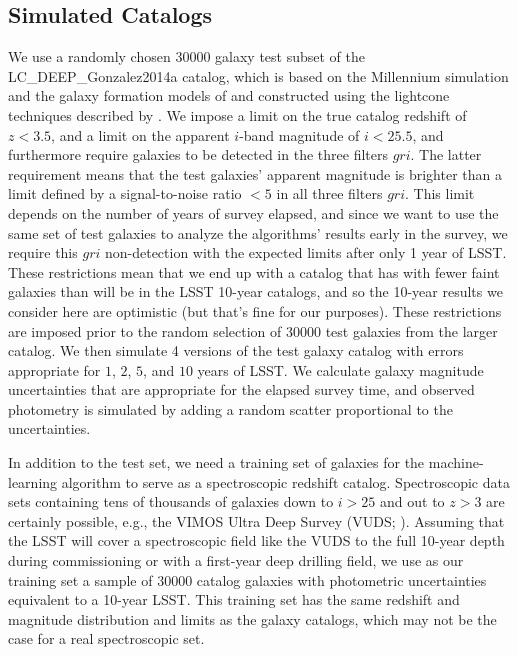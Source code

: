 \documentclass[DM,lsstdraft,toc]{lsstdoc}
\begin{document}
\subsection{Simulated Catalogs}\label{ssec:cats}

We use a randomly chosen 30000 galaxy test subset of the {\sc LC\_DEEP\_Gonzalez2014a} catalog, which is based on the Millennium simulation \citep{2005Natur.435..629S} and the galaxy formation models of \cite{2014MNRAS.439..264G} and constructed using the lightcone techniques described by \cite{2013MNRAS.429..556M}. We impose a limit on the true catalog redshift of $z<3.5$, and a limit on the apparent $i$-band magnitude of $i<25.5$, and furthermore require galaxies to be detected in the three filters $gri$. The latter requirement means that the test galaxies' apparent magnitude is brighter than a limit defined by a signal-to-noise ratio $<5$ in all three filters $gri$. This limit depends on the number of years of survey elapsed, and since we want to use the same set of test galaxies to analyze the algorithms' results early in the survey, we require this $gri$ non-detection with the expected limits after only 1 year of LSST. These restrictions mean that we end up with a catalog that has with fewer faint galaxies than will be in the LSST 10-year catalogs, and so the 10-year results we consider here are optimistic (but that's fine for our purposes). These restrictions are imposed prior to the random selection of 30000 test galaxies from the larger catalog. We then simulate 4 versions of the test galaxy catalog with errors appropriate for $1$, $2$, $5$, and $10$ years of LSST. We calculate galaxy magnitude uncertainties that are appropriate for the elapsed survey time, and observed photometry is simulated by adding a random scatter proportional to the uncertainties.

In addition to the test set, we need a training set of galaxies for the machine-learning algorithm to serve as a spectroscopic redshift catalog. Spectroscopic data sets containing tens of thousands of galaxies down to $i>25$ and out to $z>3$ are certainly possible, e.g., the VIMOS Ultra Deep Survey (VUDS; \citealt{2015A&A...576A..79L}). Assuming that the LSST will cover a spectroscopic field like the VUDS to the full 10-year depth during commissioning or with a first-year deep drilling field, we use as our training set a sample of 30000 catalog galaxies with photometric uncertainties equivalent to a 10-year LSST. This training set has the same redshift and magnitude distribution and limits as the galaxy catalogs, which may not be the case for a real spectroscopic set.
\end{document}
